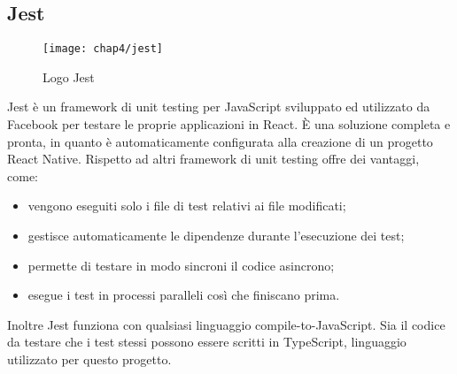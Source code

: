 \subsection{Jest}
\begin{figure}[H] 
	\centering
	\texttt{[image: chap4/jest]}
	\caption{Logo Jest}
\end{figure}
Jest è un framework di unit testing per JavaScript sviluppato ed utilizzato da
Facebook per testare le proprie applicazioni in React. È una soluzione completa
e pronta, in quanto è automaticamente configurata alla creazione di un progetto
React Native.
Rispetto ad altri framework di unit testing offre dei vantaggi, come: 
\begin{itemize}
	\item vengono eseguiti solo i file di test relativi ai file modificati;
	\item gestisce automaticamente le dipendenze durante l'esecuzione dei test;
	\item permette di testare in modo sincroni il codice asincrono;
	\item esegue i test in processi paralleli così che finiscano prima.
\end{itemize}
Inoltre Jest funziona con qualsiasi linguaggio compile-to-JavaScript. Sia il codice da testare che i test stessi possono essere scritti in TypeScript, linguaggio utilizzato per questo progetto. 
